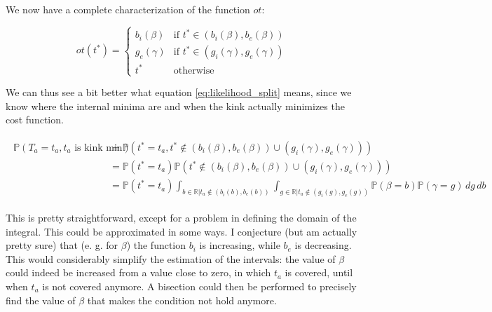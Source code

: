 \documentclass{article}
\begin{document}
We now have a complete characterization of the function \(ot\):

\begin{equation}
  \label{eq:characterized_ot}
  ot(t^*) =
  \begin{cases}
    b_i(\beta) & \text{if } t^* \in (b_i(\beta), b_e(\beta)) \\
    g_e(\gamma) & \text{if } t^* \in (g_i(\gamma), g_e(\gamma)) \\
    t^* & \text{otherwise}
  \end{cases}
\end{equation}

We can thus see a bit better what equation \eqref{eq:likelihood_split} means, since we know where the internal minima are and when the kink actually minimizes the cost function.

\begin{align}
  \label{eq:prob_internal}
  \begin{split}
    \mathbb{P}(T_a = t_a, t_a \text{ is kink min}) & = \mathbb{P}(t^* = t_a, t^* \not\in (b_i(\beta), b_e(\beta)) \cup (g_i(\gamma), g_e(\gamma))) \\
    & = \mathbb{P}(t^* = t_a)\mathbb{P}( t^* \not\in (b_i(\beta), b_e(\beta)) \cup (g_i(\gamma), g_e(\gamma))) \\
    & = \mathbb{P}(t^* = t_a)\int_{b\in \mathbb{R} \vert t_a \not\in (b_i(b), b_e(b))}\int_{g \in \mathbb{R} \vert t_a \not\in (g_i(g), g_e(g))}\mathbb{P}(\beta = b)\mathbb{P}(\gamma = g)\, dg\, db
  \end{split}
\end{align}

This is pretty straightforward, except for a problem in defining the domain of the integral.
This could be approximated in some ways.
I conjecture (but am actually pretty sure) that (e. g. for \(\beta\)) the function \(b_i\) is increasing, while \(b_e\) is decreasing.
This would considerably simplify the estimation of the intervals:
the value of \(\beta\) could indeed be increased from a value close to zero, in which \(t_a\) is covered, until when \(t_a\) is not covered anymore.
A bisection could then be performed to precisely find the value of \(\beta\) that makes the condition not hold anymore.
\end{document}
